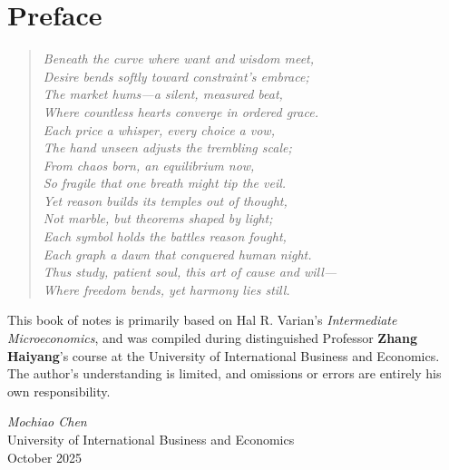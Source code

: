 \documentclass{book}
\begin{document}
\addtocounter{page}{2}
\chapter*{Preface}

\begin{verse}
\textit{Beneath the curve where want and wisdom meet,\\
Desire bends softly toward constraint's embrace;\\
The market hums—a silent, measured beat,\\
Where countless hearts converge in ordered grace.\\

Each price a whisper, every choice a vow,\\
The hand unseen adjusts the trembling scale;\\
From chaos born, an equilibrium now,\\
So fragile that one breath might tip the veil.\\

Yet reason builds its temples out of thought,\\
Not marble, but theorems shaped by light;\\
Each symbol holds the battles reason fought,\\
Each graph a dawn that conquered human night.\\

Thus study, patient soul, this art of cause and will—\\
Where freedom bends, yet harmony lies still.}
\end{verse}

\vspace{1em}

This book of notes is primarily based on Hal R. Varian's \textit{Intermediate Microeconomics},  
and was compiled during distinguished Professor \textbf{Zhang Haiyang}'s course at the University of International Business and Economics.  
The author's understanding is limited, and omissions or errors are entirely his own responsibility.

\begin{flushright}
\textit{Mochiao Chen}\\
University of International Business and Economics\\
October 2025
\end{flushright}


\setcounter{tocdepth}{3}
\tableofcontents

\mainmatter%











\backmatter%
\printindex
\end{document}
